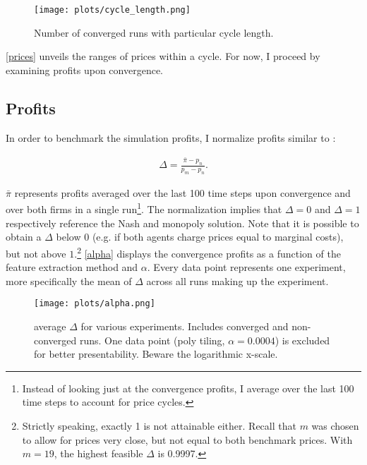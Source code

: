 \begin{figure}
	\texttt{[image: plots/cycle\_length.png]}
	\caption{Number of converged runs with particular cycle length.}
	\label{cycle_length}
\end{figure}

\autoref{prices} unveils the ranges of prices within a cycle. For now, I proceed by examining profits upon convergence.

\subsection{Profits}

In order to benchmark the simulation profits, I normalize profits similar to \textcite{calvano_algorithmic_2018}:

\begin{gather}
\Delta = \frac{\bar{\pi} - p_n}{p_m - p_n}.
\end{gather}

$\bar{\pi}$ represents profits averaged over the last 100 time steps upon convergence and over both firms in a single run\footnote{Instead of looking just at the convergence profits, I average over the last 100 time steps to account for price cycles.}. The normalization implies that $\Delta = 0$ and $\Delta = 1$ respectively reference the Nash and monopoly solution. Note that it is possible to obtain a $\Delta$ below $0$ (e.g. if both agents charge prices equal to marginal costs), but not above $1$.\footnote{Strictly speaking, exactly 1 is not attainable either. Recall that $m$ was chosen to allow for prices very close, but not equal to both benchmark prices. With $m = 19$, the highest feasible $\Delta$ is 0.9997.} \autoref{alpha} displays the convergence profits as a function of the feature extraction method and $\alpha$. Every data point represents one experiment, more specifically the mean of $\Delta$ across all runs making up the experiment.

\begin{figure}
	\texttt{[image: plots/alpha.png]}
	\caption{average $\Delta$ for various experiments. Includes converged and non-converged runs. One data point (poly tiling, $\alpha = 0.0004$) is excluded for better presentability. Beware the logarithmic x-scale.}
	\label{alpha}
\end{figure}

